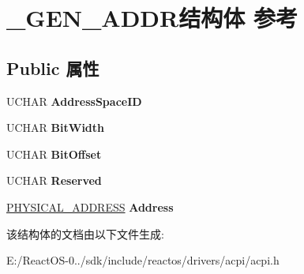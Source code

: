 \hypertarget{struct___g_e_n___a_d_d_r}{}\section{\+\_\+\+G\+E\+N\+\_\+\+A\+D\+D\+R结构体 参考}
\label{struct___g_e_n___a_d_d_r}
\subsection*{Public 属性}
\begin{DoxyCompactItemize}
\item 
\mbox{\label{struct___g_e_n___a_d_d_r_a166e36cacba8eaf4b7698b2e1759ae68}} 
U\+C\+H\+AR {\bfseries Address\+Space\+ID}
\item 
\mbox{\label{struct___g_e_n___a_d_d_r_aad0c3cd313df097d5a09ac1dcfe0fc49}} 
U\+C\+H\+AR {\bfseries Bit\+Width}
\item 
\mbox{\label{struct___g_e_n___a_d_d_r_a23f5543596c235e20515dac5eea71d4f}} 
U\+C\+H\+AR {\bfseries Bit\+Offset}
\item 
\mbox{\label{struct___g_e_n___a_d_d_r_ab5bfe58d603b0f487fc901904845a5b8}} 
U\+C\+H\+AR {\bfseries Reserved}
\item 
\mbox{\label{struct___g_e_n___a_d_d_r_a3c136d2f2618a8a442678dc659a3c2c0}} 
\hyperlink{union___l_a_r_g_e___i_n_t_e_g_e_r}{P\+H\+Y\+S\+I\+C\+A\+L\+\_\+\+A\+D\+D\+R\+E\+SS} {\bfseries Address}
\end{DoxyCompactItemize}


该结构体的文档由以下文件生成\+:\begin{DoxyCompactItemize}
\item 
E\+:/\+React\+O\+S-\/0../sdk/include/reactos/drivers/acpi/acpi.\+h\end{DoxyCompactItemize}
